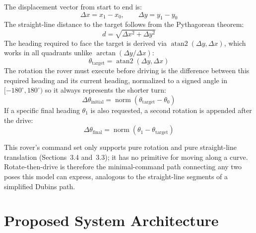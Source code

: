 \documentclass[12pt]{report}
\begin{document}
The displacement vector from start to end is:
\begin{equation}
\Delta x = x_1 - x_0, \qquad \Delta y = y_1 - y_0
\end{equation}
The straight-line distance to the target follows from the Pythagorean theorem:
\begin{equation}
d = \sqrt{\Delta x^2 + \Delta y^2}
\end{equation}
The heading required to face the target is derived via $\operatorname{atan2}(\Delta y, \Delta x)$, which works in all quadrants unlike $\arctan(\Delta y/\Delta x)$:
\begin{equation}
\theta_{\text{target}} = \operatorname{atan2}(\Delta y, \Delta x)
\end{equation}
The rotation the rover must execute before driving is the difference between this required heading and its current heading, normalized to a signed angle in $[-180^\circ, 180^\circ)$ so it always represents the shorter turn:
\begin{equation}
\Delta\theta_{\text{initial}} = \operatorname{norm}(\theta_{\text{target}} - \theta_0)
\end{equation}
If a specific final heading $\theta_1$ is also requested, a second rotation is appended after the drive:
\begin{equation}
\Delta\theta_{\text{final}} = \operatorname{norm}(\theta_1 - \theta_{\text{target}})
\end{equation}
\begin{infobox}[title={Why Rotate-Then-Drive, Not a Curved Path}]
This rover's command set only supports pure rotation and pure straight-line translation (Sections~3.4 and~3.3); it has no primitive for moving along a curve. Rotate-then-drive is therefore the minimal-command path connecting any two poses this model can express, analogous to the straight-line segments of a simplified Dubins path.
\end{infobox}

\chapter{Proposed System Architecture}
\end{document}
